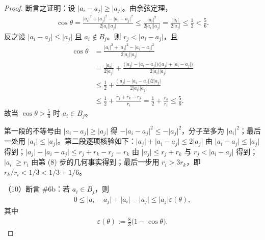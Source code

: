 \documentclass[../../main.tex]{subfiles}%
\begin{document}
\begin{proof}
断言之证明：设 $\lvert a_i-a_j\rvert\geqslant\lvert a_j\rvert$。由余弦定理，
\begin{align*}
\cos\theta=\frac{\lvert a_i\rvert^{2}+\lvert a_j\rvert^{2}-\lvert a_i-a_j\rvert^{2}}{2\lvert a_i\rvert\lvert a_j\rvert}
\leqslant\frac{\lvert a_i\rvert^{2}}{2\lvert a_i\rvert\lvert a_j\rvert}
=\frac{\lvert a_i\rvert}{2\lvert a_j\rvert}\leqslant\frac{1}{2}<\frac{5}{6}.
\end{align*}
反之设 $\lvert a_i-a_j\rvert\leqslant\lvert a_j\rvert$ 且 $a_i\notin B_j$。则 $r_j<\lvert a_i-a_j\rvert$，且
\begin{align*}
\cos\theta&=\frac{\lvert a_i\rvert^{2}+\lvert a_j\rvert^{2}-\lvert a_i-a_j\rvert^{2}}{2\lvert a_i\rvert\lvert a_j\rvert}\\
&=\frac{\lvert a_i\rvert}{2\lvert a_j\rvert}
+\frac{\bigl(\lvert a_j\rvert-\lvert a_i-a_j\rvert\bigr)\bigl(\lvert a_j\rvert+\lvert a_i-a_j\rvert\bigr)}{2\lvert a_i\rvert\lvert a_j\rvert}\\
&\leqslant\frac{1}{2}+\frac{\bigl(\lvert a_j\rvert-\lvert a_i-a_j\rvert\bigr)2\lvert a_j\rvert}{2\lvert a_i\rvert\lvert a_j\rvert}\\
&\leqslant\frac{1}{2}+\frac{r_j+r_k-r_j}{r_i}
=\frac{1}{2}+\frac{r_k}{r_i}\leqslant\frac{5}{6}.
\end{align*}
故当 $\cos\theta>\frac{5}{6}$ 时 $a_i\in B_j$。

第一段的不等号由 $\lvert a_i-a_j\rvert\geqslant\lvert a_j\rvert$ 得 $-\lvert a_i-a_j\rvert^{2}\leqslant-\lvert a_j\rvert^{2}$，分子至多为 $\lvert a_i\rvert^{2}$；最后一处用 $\lvert a_i\rvert\leqslant\lvert a_j\rvert$。第二段逐项核验如下：$\lvert a_j\rvert+\lvert a_i-a_j\rvert\leqslant2\lvert a_j\rvert$ 由 $\lvert a_i-a_j\rvert\leqslant\lvert a_j\rvert$ 得到；$\lvert a_j\rvert-\lvert a_i-a_j\rvert\leqslant r_j+r_k-r_j=r_k$ 由 $\lvert a_j\rvert\leqslant r_j+r_k$ 与 $r_j<\lvert a_i-a_j\rvert$ 得到；$\lvert a_i\rvert\geqslant r_i$ 由第 (8) 步的几何事实得到；最后一步用 $r_i>3r_k$，即 $r_k/r_i<1/3<1/3+1/6$。

（10）断言 \#6b：若 $a_i\in B_j$，则
\begin{align*}
0\leqslant\lvert a_i-a_j\rvert+\lvert a_i\rvert-\lvert a_j\rvert\leqslant\lvert a_j\rvert\varepsilon(\theta),
\end{align*}
其中
\begin{align*}
\varepsilon(\theta):=\frac{8}{3}\bigl(1-\cos\theta\bigr).
\end{align*}


\end{proof}
\end{document}
